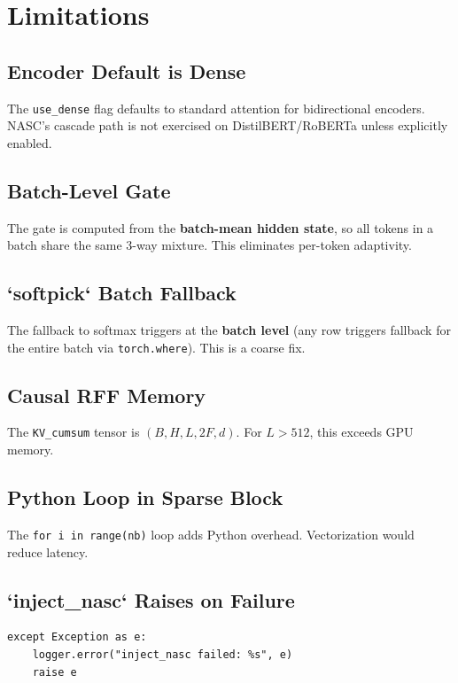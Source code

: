 
\section{Limitations}

\subsection{Encoder Default is Dense}

The \texttt{use\_dense} flag defaults to standard attention for bidirectional 
encoders. NASC's cascade path is not exercised on DistilBERT/RoBERTa 
unless explicitly enabled.

\subsection{Batch-Level Gate}

The gate is computed from the \textbf{batch-mean hidden state}, so all tokens 
in a batch share the same 3-way mixture. This eliminates per-token 
adaptivity.

\subsection{`softpick` Batch Fallback}

The fallback to softmax triggers at the \textbf{batch level} (any row triggers 
fallback for the entire batch via \texttt{torch.where}). This is a coarse fix.

\subsection{Causal RFF Memory}

The \texttt{KV\_cumsum} tensor is $(B, H, L, 2F, d)$. For $L > 512$, this exceeds 
GPU memory.

\subsection{Python Loop in Sparse Block}

The \texttt{for i in range(nb)} loop adds Python overhead. Vectorization would 
reduce latency.

\subsection{`inject\_nasc` Raises on Failure}

\begin{lstlisting}
except Exception as e:
    logger.error("inject_nasc failed: %s", e)
    raise e
\end{lstlisting}


